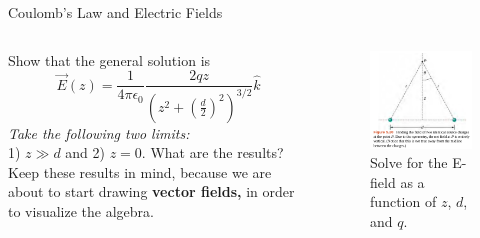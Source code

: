 \documentclass{beamer}
\begin{document}
\begin{frame}{Coulomb’s Law and Electric Fields}
\small
\begin{columns}[T]
\begin{column}{0.5\textwidth}
Show that the general solution is
\begin{equation}
\vec{E}(z) = \frac{1}{4\pi\epsilon_0} \frac{2qz}{\left(z^2+\left(\frac{d}{2}\right)^2\right)^{3/2}} \hat{k}
\end{equation}
\textit{Take the following two limits:} \\ 1) $z \gg d$ and 2) $z=0$.  What are the results? \\ \vspace{0.5cm}
Keep these results in mind, because we are about to start drawing \textbf{vector fields,} in order to visualize the algebra.
\end{column}
\begin{column}{0.5\textwidth}
\begin{figure}
\includegraphics[width=\textwidth]{figures/twoChargesZ.png}
\caption{\label{fig:twoChargesZ2} Solve for the E-field as a function of $z$, $d$, and $q$.}
\end{figure}
\end{column}
\end{columns}
\end{frame}
\end{document}
